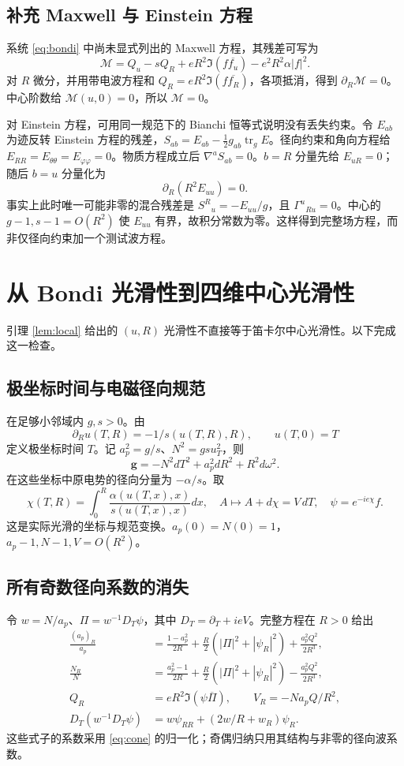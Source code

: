 \subsection{补充 Maxwell 与 Einstein 方程}
系统 \eqref{eq:bondi} 中尚未显式列出的 Maxwell 方程，其残差可写为
\[
\mathcal M=Q_u-sQ_R+eR^2\Im(f\overline{f_u})-e^2R^2\alpha|f|^2.
\]
对 $R$ 微分，并用带电波方程和 $Q_R=eR^2\Im(f\overline{f_R})$，各项抵消，得到 $\partial_R\mathcal M=0$。中心阶数给 $\mathcal M(u,0)=0$，所以 $\mathcal M=0$。

对 Einstein 方程，可用同一规范下的 Bianchi 恒等式说明没有丢失约束。令 $E_{ab}$ 为迹反转 Einstein 方程的残差，$S_{ab}=E_{ab}-\frac12g_{ab}\operatorname{tr}_gE$。径向约束和角向方程给 $E_{RR}=E_{\theta\theta}=E_{\varphi\varphi}=0$。物质方程成立后 $\nabla^aS_{ab}=0$。$b=R$ 分量先给 $E_{uR}=0$；随后 $b=u$ 分量化为
\[
\partial_R(R^2E_{uu})=0.
\]
事实上此时唯一可能非零的混合残差是 $S^R{}_u=-E_{uu}/g$，且 $\Gamma^u{}_{Ru}=0$。中心的 $g-1,s-1=O(R^2)$ 使 $E_{uu}$ 有界，故积分常数为零。这样得到完整场方程，而非仅径向约束加一个测试波方程。

\section{从 Bondi 光滑性到四维中心光滑性}

引理 \ref{lem:local} 给出的 $(u,R)$ 光滑性不直接等于笛卡尔中心光滑性。以下完成这一检查。

\subsection{极坐标时间与电磁径向规范}
在足够小邻域内 $g,s>0$。由
\begin{equation}\label{eq:polarcoordinate}
\partial_Ru(T,R)=-1/s(u(T,R),R),\qquad u(T,0)=T
\end{equation}
定义极坐标时间 $T$。记 $a_p^2=g/s$、$N^2=gsu_T^2$，则
\[
\mathbf g=-N^2dT^2+a_p^2dR^2+R^2d\omega^2.
\]
在这些坐标中原电势的径向分量为 $-\alpha/s$。取
\[
\chi(T,R)=\int_0^R\frac{\alpha(u(T,x),x)}{s(u(T,x),x)}dx,
\quad A\mapsto A+d\chi=V\,dT,\quad
\psi=e^{-ie\chi}f.
\]
这是实际光滑的坐标与规范变换。$a_p(0)=N(0)=1$，$a_p-1,N-1,V=O(R^2)$。

\subsection{所有奇数径向系数的消失}
令 $w=N/a_p$、$\Pi=w^{-1}D_T\psi$，其中 $D_T=\partial_T+ieV$。完整方程在 $R>0$ 给出
\begin{equation}\label{eq:polar}
\begin{split}
\frac{(a_p)_R}{a_p}
&=\frac{1-a_p^2}{2R}+\frac R2(|\Pi|^2+|\psi_R|^2)
+\frac{a_p^2Q^2}{2R^3},\\
\frac{N_R}{N}
&=\frac{a_p^2-1}{2R}+\frac R2(|\Pi|^2+|\psi_R|^2)
-\frac{a_p^2Q^2}{2R^3},\\
Q_R&=eR^2\Im(\psi\overline\Pi),\qquad
V_R=-Na_pQ/R^2,\\
D_T(w^{-1}D_T\psi)
&=w\psi_{RR}+(2w/R+w_R)\psi_R.
\end{split}
\end{equation}
这些式子的系数采用 \eqref{eq:cone} 的归一化；奇偶归纳只用其结构与非零的径向波系数。

